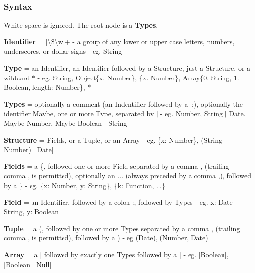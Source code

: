 \subsubsection*{Syntax}

White space is ignored. The root node is a {\bfseries Types}.


\begin{DoxyItemize}
\item {\bfseries Identifier} = {\ttfamily \mbox{[}\textbackslash{}\$\textbackslash{}w\mbox{]}+} -\/ a group of any lower or upper case letters, numbers, underscores, or dollar signs -\/ eg. {\ttfamily String}
\item {\bfseries Type} = an {\ttfamily Identifier}, an {\ttfamily Identifier} followed by a {\ttfamily Structure}, just a {\ttfamily Structure}, or a wildcard {\ttfamily $\ast$} -\/ eg. {\ttfamily String}, {\ttfamily Object\{x\+: Number\}}, {\ttfamily \{x\+: Number\}}, {\ttfamily Array\{0\+: String, 1\+: Boolean, length\+: Number\}}, {\ttfamily $\ast$}
\item {\bfseries Types} = optionally a comment (an {\ttfamily Indentifier} followed by a {\ttfamily \+:\+:}), optionally the identifier {\ttfamily Maybe}, one or more {\ttfamily Type}, separated by {\ttfamily $\vert$} -\/ eg. {\ttfamily Number}, {\ttfamily String $\vert$ Date}, {\ttfamily Maybe Number}, {\ttfamily Maybe Boolean $\vert$ String}
\item {\bfseries Structure} = {\ttfamily Fields}, or a {\ttfamily Tuple}, or an {\ttfamily Array} -\/ eg. {\ttfamily \{x\+: Number\}}, {\ttfamily (String, Number)}, {\ttfamily \mbox{[}Date\mbox{]}}
\item {\bfseries Fields} = a {\ttfamily \{}, followed one or more {\ttfamily Field} separated by a comma {\ttfamily ,} (trailing comma {\ttfamily ,} is permitted), optionally an {\ttfamily ...} (always preceded by a comma {\ttfamily ,}), followed by a {\ttfamily \}} -\/ eg. {\ttfamily \{x\+: Number, y\+: String\}}, {\ttfamily \{k\+: Function, ...\}}
\item {\bfseries Field} = an {\ttfamily Identifier}, followed by a colon {\ttfamily \+:}, followed by {\ttfamily Types} -\/ eg. {\ttfamily x\+: Date $\vert$ String}, {\ttfamily y\+: Boolean}
\item {\bfseries Tuple} = a {\ttfamily (}, followed by one or more {\ttfamily Types} separated by a comma {\ttfamily ,} (trailing comma {\ttfamily ,} is permitted), followed by a {\ttfamily )} -\/ eg {\ttfamily (Date)}, {\ttfamily (Number, Date)}
\item {\bfseries Array} = a {\ttfamily \mbox{[}} followed by exactly one {\ttfamily Types} followed by a {\ttfamily \mbox{]}} -\/ eg. {\ttfamily \mbox{[}Boolean\mbox{]}}, {\ttfamily \mbox{[}Boolean $\vert$ Null\mbox{]}}
\end{DoxyItemize}


